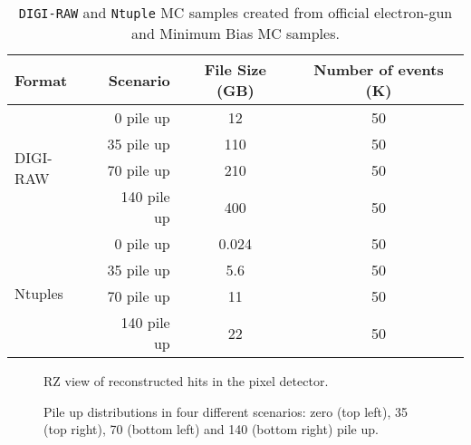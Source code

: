 \documentclass[a4paper,12pt,oneside]{article}
\begin{document}
                   \begin{table}[!htb]
                     \centering
                     \caption{\texttt{DIGI-RAW} and \texttt{Ntuple} MC samples created from official electron-gun and Minimum Bias MC
                       samples.}
                     \label{}
                     \begin{tabular}{lrcc}
\hline
{\bf Format}              & {\bf Scenario} & {\bf File Size (GB)} & {\bf Number of events (K)} \\ \hline \hline
\multirow{4}{*}{DIGI-RAW} & 0 pile up      & 12                   & 50                         \\
                          & 35 pile up     & 110                  & 50                         \\
                          & 70 pile up     & 210                  & 50                         \\
                          & 140 pile up    & 400                  & 50                         \\ \hline
\multirow{4}{*}{Ntuples}  & 0 pile up      & 0.024                & 50                         \\
                          & 35 pile up     & 5.6                  & 50                         \\
                          & 70 pile up     & 11                   & 50                         \\
                          & 140 pile up    & 22                   & 50                         \\ \hline
                     \end{tabular}
                   \end{table}
                   
                   \begin{figure}[!htb]
                     \centering
                     \caption{RZ view of reconstructed hits in the pixel detector.}
                     \label{}
                   \end{figure}
                   
                   \begin{figure}[!htb]
                     \centering
                     \caption{Pile up distributions in four different scenarios: zero (top left), 35 (top right), 70 (bottom
                       left) and 140 (bottom right) pile up.}
                     \label{}
                   \end{figure}
                   
\end{document}

